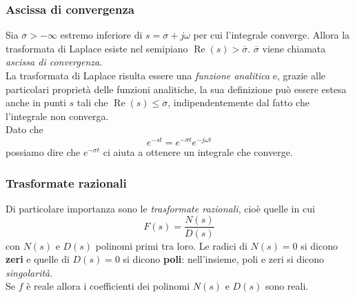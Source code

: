 \documentclass{article}
\numberwithin{equation}{subsection}
\begin{document}
\subsubsection{Ascissa di convergenza}
Sia $\overline{\sigma}>- \infty$ estremo inferiore di $s=\sigma + j \omega$ per cui l'integrale converge. Allora la trasformata di Laplace esiste nel semipiano $\operatorname{Re} (s)>\overline{\sigma}$. $\overline{\sigma}$ viene chiamata \textit{ascissa di convergenza}.\\
La trasformata di Laplace risulta essere una \textit{funzione analitica} e, grazie alle particolari proprietà delle funzioni analitiche, la sua definizione può essere estesa anche in punti $s$ tali che $ \operatorname{Re}(s)\leq \overline{\sigma}$, indipendentemente dal fatto che l'integrale non converga.
\vspace*{0.2cm}\\
Dato che 
\begin{equation}
    e^{-st} = e^{- \sigma t}e^{-j \omega t}
\end{equation}
possiamo dire che $e^{-\sigma t}$ ci aiuta a ottenere un integrale che converge.
\begin{center}
    \end{center}
\subsubsection{Trasformate razionali}
Di particolare importanza sono le \textit{trasformate razionali}, cioè quelle in cui
\begin{equation}
    F(s) = \frac{N(s)}{D(s)}
\end{equation}
con $N(s)$ e $D(s)$ polinomi primi tra loro. Le radici di $N(s)=0$ si dicono \textbf{zeri} e quelle di $D(s)=0$ si dicono \textbf{poli}: nell'insieme, poli e zeri si dicono \textit{singolarità}.
\vspace*{0.1cm}\\
Se $f$ è reale allora i coefficienti dei polinomi $N(s)$ e $D(s)$ sono reali.
\end{document}
